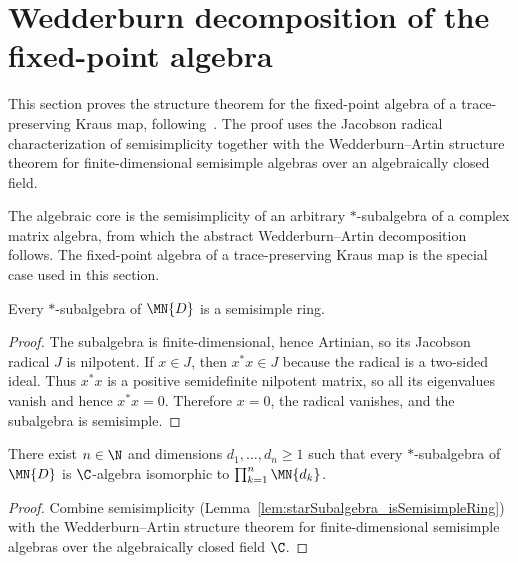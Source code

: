 \section{Wedderburn decomposition of the fixed-point algebra}

This section proves the structure theorem for the fixed-point algebra of a
trace-preserving Kraus map,
following~\cite[Theorems~6.12--6.14]{Wolf2012Quantum}. The proof uses the
Jacobson radical characterization of semisimplicity together with the
Wedderburn--Artin structure theorem for finite-dimensional semisimple
algebras over an algebraically closed field.

The algebraic core is the semisimplicity of an arbitrary $*$-subalgebra of a
complex matrix algebra, from which the abstract Wedderburn--Artin
decomposition follows. The fixed-point algebra of a trace-preserving Kraus
map is the special case used in this section.

\begin{lemma}%
    \label{lem:starSubalgebra_isSemisimpleRing}
    \leanok
    Every $*$-subalgebra of $\MN{D}$ is a semisimple ring.
\end{lemma}

\begin{proof}
    \leanok
    The subalgebra is finite-dimensional, hence Artinian, so its Jacobson
    radical $J$ is nilpotent. If $x\in J$, then $x^*x\in J$ because the
    radical is a two-sided ideal. Thus $x^*x$ is a positive semidefinite
    nilpotent matrix, so all its eigenvalues vanish and hence $x^*x=0$.
    Therefore $x=0$, the radical vanishes, and the subalgebra is
    semisimple.
\end{proof}

\begin{theorem}%
    \label{thm:starSubalgebra_wedderburnArtin}
    \leanok
    There exist $n\in\N$ and dimensions $d_1,\ldots,d_n\geq1$ such that
    every $*$-subalgebra of $\MN{D}$ is $\C$-algebra isomorphic to
    $\prod_{k=1}^n\MN{d_k}$.
\end{theorem}

\begin{proof}
    \leanok
    Combine semisimplicity
    (Lemma~\ref{lem:starSubalgebra_isSemisimpleRing}) with the
    Wedderburn--Artin structure theorem for finite-dimensional semisimple
    algebras over the algebraically closed field $\C$.
\end{proof}

